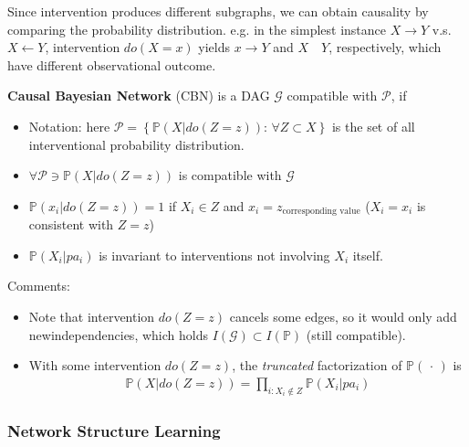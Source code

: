 Since intervention produces different subgraphs, we can obtain causality by comparing the probability distribution. e.g. in the simplest instance $ X\to Y $ v.s. $ X\leftarrow Y $, intervention $ do(X=x) $ yields $ x\to Y $ and $ X\quad Y $, respectively, which have different observational outcome.

\textbf{Causal Bayesian Network} (CBN) is a DAG $ \mathcal{G} $ compatible with $ \mathcal{P} $, if 
\begin{itemize}[topsep=2pt,itemsep=0pt]
    \item Notation: here $ \mathcal{P}=\left\{ \mathbb{P}\left( X|do(Z=z) \right):\,\forall Z\subset X  \right\} $ is the set of all interventional probability distribution.
    \item $ \forall \mathcal{P}\ni \mathbb{P}\left( X|do(Z=z) \right)   $ is compatible with $ \mathcal{G} $
    \item $ \mathbb{P}\left( x_i|do(Z=z) \right)=1   $ if $ X_i\in Z $ and $ x_i=z_{\text{corresponding value}} $ ($ X_i=x_i $ is consistent with $ Z=z $)
    \item $ \mathbb{P}\left( X_i|pa_i \right)  $ is invariant to interventions not involving $ X_i $ itself.
\end{itemize}

Comments:
\begin{itemize}[topsep=2pt,itemsep=0pt]
    \item Note that intervention $ do(Z=z) $ cancels some edges, so it would only add newindependencies, which holds $ I(\mathcal{G})\subset I(\mathbb{P} ) $ (still compatible).
    \item With some intervention $ do(Z=z) $, the \textit{truncated} factorization of $ \mathbb{P}\left( \, \cdot \,  \right)  $ is
    \begin{align}
        \mathbb{P}\left( X | do(Z=z) \right)  =  \prod_{i:X_i\notin Z}\mathbb{P}\left( X_i|pa_i \right) 
    \end{align}
    
    
\end{itemize}

    

    








\subsubsection{Network Structure Learning}


